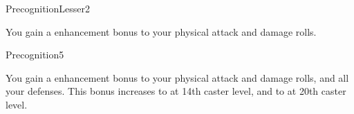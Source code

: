 \begin{spellsection}{Precognition}{Lesser}{2}
\begin{spellheader}
\end{spellheader}
\begin{spellcontent}
    \begin{spelltargetinginfo}
    \end{spelltargetinginfo}
    \begin{spelleffects}
        \spelleffect You gain a  enhancement bonus to your physical attack and damage rolls. \spellbonusscalingdescription
        \spelldur \durshort \dismissable
    \end{spelleffects}
\end{spellcontent}
\begin{spellfooter}
\end{spellfooter}
\end{spellsection}

\begin{spellsection}{Precognition}{5}
\begin{spellheader}
\end{spellheader}
\begin{spellcontent}
    \begin{spelltargetinginfo}
    \end{spelltargetinginfo}
    \begin{spelleffects}
        \spelleffect You gain a  enhancement bonus to your physical attack and damage rolls, and all your defenses. This bonus increases to  at 14th caster level, and to  at 20th caster level.
        \spelldur \durshort \dismissable
    \end{spelleffects}
\end{spellcontent}
\begin{spellfooter}
\end{spellfooter}
\end{spellsection}

